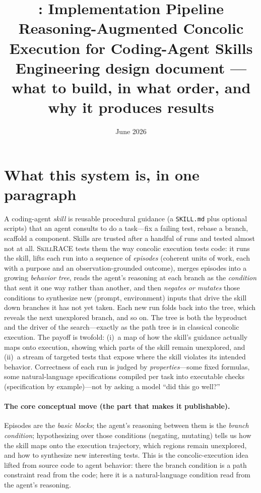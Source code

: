 \documentclass[11pt]{article}
\title{\tool: Implementation Pipeline\\
\large Reasoning-Augmented Concolic Execution for Coding-Agent Skills\\
\normalsize Engineering design document --- what to build, in what order, and why it produces results}
\author{}
\date{June 2026}
\newcommand{\tool}{\textsc{SkillRACE}\xspace}
\begin{document}
\maketitle

\section{What this system is, in one paragraph}

A coding-agent \emph{skill} is reusable procedural guidance (a \texttt{SKILL.md}
plus optional scripts) that an agent consults to do a task---fix a failing
test, rebase a branch, scaffold a component. Skills are trusted after a handful
of runs and tested almost not at all. \tool tests them the way concolic
execution tests code: it runs the skill, lifts each run into a sequence of
\emph{episodes} (coherent units of work, each with a purpose and an
observation-grounded outcome), merges episodes into a growing \emph{behavior
tree}, reads the agent's reasoning at each branch as the \emph{condition} that
sent it one way rather than another, and then \emph{negates or mutates} those
conditions to synthesize new (prompt, environment) inputs that drive the skill
down branches it has not yet taken. Each new run folds back into the tree, which
reveals the next unexplored branch, and so on. The tree is both the byproduct
and the driver of the search---exactly as the path tree is in classical
concolic execution. The payoff is twofold: (i)~a map of how the skill's guidance
actually maps onto execution, showing which parts of the skill remain
unexplored, and (ii)~a stream of targeted tests that expose where the skill
violates its intended behavior. Correctness of each run is judged by
\emph{properties}---some fixed formulas, some natural-language specifications
compiled per task into executable checks (specification by example)---not by
asking a model ``did this go well?''

\paragraph{The core conceptual move (the part that makes it publishable).}
Episodes are the \emph{basic blocks}; the agent's reasoning between them is the
\emph{branch condition}; hypothesizing over those conditions (negating,
mutating) tells us how the skill maps onto the execution trajectory, which
regions remain unexplored, and how to synthesize new interesting tests. This is
the concolic-execution idea lifted from source code to agent behavior: there the
branch condition is a path constraint read from the code; here it is a
natural-language condition read from the agent's reasoning.
\end{document}
